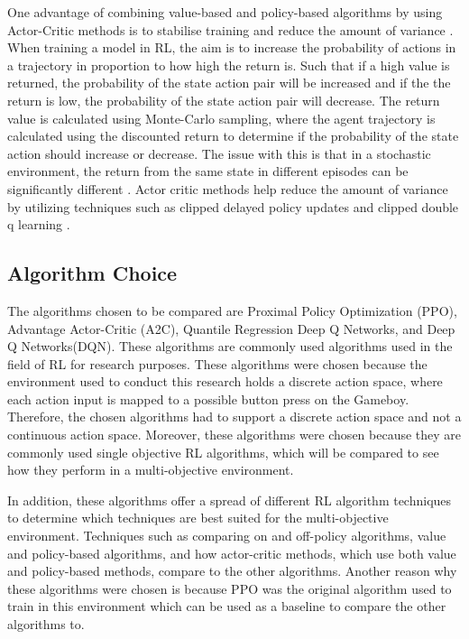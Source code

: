 
One advantage of combining value-based and policy-based algorithms by using Actor-Critic methods is to stabilise training and reduce the amount of variance \cite{SergiosKaragiannakos2018}. When training a model in RL, the aim is to increase the probability of actions in a trajectory in proportion to how high the return is. Such that if a high value is returned, the probability of the state action pair will be increased and if the the return is low, the probability of the state action pair will decrease. The return value is calculated using Monte-Carlo sampling, where the agent trajectory is calculated using the discounted return to determine if the probability of the state action should increase or decrease. The issue with this is that in a stochastic environment, the return from the same state in different episodes can be significantly different \cite{ThomasSimonini2022A2C}. Actor critic methods help reduce the amount of variance by utilizing techniques such as clipped delayed policy updates and clipped double q learning \cite{padhye2023deep}.

\subsection{Algorithm Choice}

The algorithms chosen to be compared are Proximal Policy Optimization (PPO), Advantage Actor-Critic (A2C), Quantile Regression Deep Q Networks, and Deep Q Networks(DQN). These algorithms are commonly used algorithms used in the field of RL for research purposes. These algorithms were chosen because the environment used to conduct this research holds a discrete action space, where each action input is mapped to a possible button press on the Gameboy. Therefore, the chosen algorithms had to support a discrete action space and not a continuous action space. Moreover, these algorithms were chosen because they are commonly used single objective RL algorithms, which will be compared to see how they perform in a multi-objective environment.

In addition, these algorithms offer a spread of different RL algorithm techniques to determine which techniques are best suited for the multi-objective environment. Techniques such as comparing on and off-policy algorithms, value and policy-based algorithms, and how actor-critic methods, which use both value and policy-based methods, compare to the other algorithms. Another reason why these algorithms were chosen is because PPO was the original algorithm used to train in this environment which can be used as a baseline to compare the other algorithms to. 

